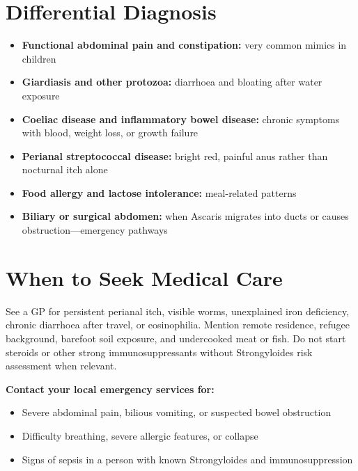 \section*{Differential Diagnosis}
\begin{itemize}
    \item \textbf{Functional abdominal pain and constipation:} very common mimics in children
    \item \textbf{Giardiasis and other protozoa:} diarrhoea and bloating after water exposure
    \item \textbf{Coeliac disease and inflammatory bowel disease:} chronic symptoms with blood, weight loss, or growth failure
    \item \textbf{Perianal streptococcal disease:} bright red, painful anus rather than nocturnal itch alone
    \item \textbf{Food allergy and lactose intolerance:} meal-related patterns
    \item \textbf{Biliary or surgical abdomen:} when Ascaris migrates into ducts or causes obstruction---emergency pathways
\end{itemize}

\section*{When to Seek Medical Care}
See a GP for persistent perianal itch, visible worms, unexplained iron deficiency, chronic diarrhoea after travel, or eosinophilia. Mention remote residence, refugee background, barefoot soil exposure, and undercooked meat or fish. Do not start steroids or other strong immunosuppressants without Strongyloides risk assessment when relevant.

\textbf{Contact your local emergency services for:}
\begin{itemize}
    \item Severe abdominal pain, bilious vomiting, or suspected bowel obstruction
    \item Difficulty breathing, severe allergic features, or collapse
    \item Signs of sepsis in a person with known Strongyloides and immunosuppression
\end{itemize}

